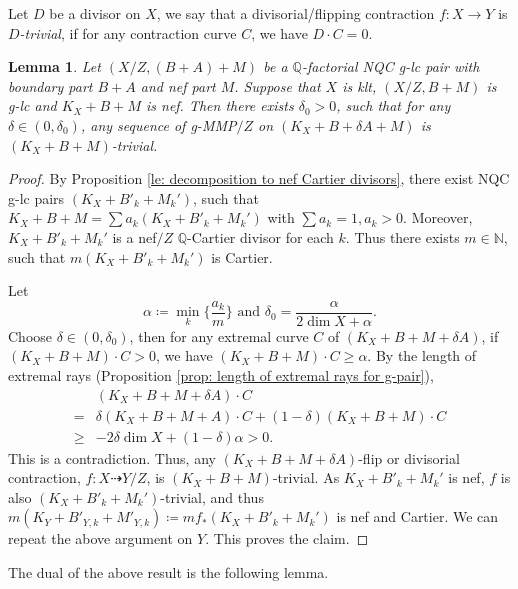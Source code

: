 \documentclass[11pt]{amsart}
\newcommand{\Qq}{\mathbb{Q}}
\newcommand{\Nn}{\mathbb{N}}
\newtheorem{lemma}[theorem]{Lemma}
\begin{document}
Let $D$ be a divisor on $X$, we say that a divisorial/flipping contraction $f: X \to Y$ is \emph{$D$-trivial}, if for any contraction curve $C$, we have $D \cdot C =0$.

\begin{lemma}\label{prop: K trivial}
	Let $(X/Z, (B+A)+M)$ be a $\Qq$-factorial NQC g-lc pair with boundary part $B+A$  and nef part $M$. Suppose that $X$ is klt, $(X/Z,B+M)$ is g-lc and $K_X+B+M$ is nef. Then there exists $\delta_0>0$, such that for any $\delta \in (0, \delta_0)$, any sequence of g-MMP$/Z$ on $(K_X+B+\delta A+M)$ is $(K_X+B+M)$-trivial.
\end{lemma}

\begin{proof}
	By Proposition \ref{le: decomposition to nef Cartier divisors}, there exist NQC g-lc pairs $(K_X+B'_k +M_k')$, such that 
	$K_X+B+M = \sum a_k (K_X+B'_k +M_k')$ with $\sum a_k =1, a_k >0$. Moreover, $K_X+B'_k +M_k'$ is a nef$/Z$ $\Qq$-Cartier divisor for each $k$. Thus there exists $m\in\Nn$, such that $m(K_X+B'_k +M_k')$ is Cartier. 
	
	Let 
	\[
	\alpha\coloneqq \min_k\{\frac{a_k}{m}\} \text{~and~} \delta_0=\frac{\alpha}{2\dim X+\alpha}.
	\] Choose $\delta \in (0,\delta_0)$, then for any extremal curve $C$ of $(K_X+B+M+\delta A)$, if $(K_X+B+M) \cdot C>0$, we have  $(K_X+B+M) \cdot C \geq \alpha$. By the length of extremal rays (Proposition \ref{prop: length of extremal rays for g-pair}),
	\begin{align*}
	&(K_X+B+M+\delta A)\cdot C\\
	=&\delta(K_X+B+M+A)\cdot C+(1-\delta)(K_X+B+M)\cdot C\\
	\ge& -2\delta\dim X+(1-\delta)\alpha>0.
	\end{align*} This is a contradiction. 
	Thus, any $(K_X+B+M+\delta A)$-flip or divisorial contraction, $f: X \dashrightarrow Y/Z$, is $(K_X+B+M)$-trivial. As $K_X+B'_k +M_k'$ is nef, $f$ is also $(K_X+B'_k +M_k')$-trivial, and thus $m(K_Y+B'_{Y,k}+M'_{Y,k})\coloneqq mf_{*}(K_X+B'_k +M_k')$ is nef and Cartier. We can repeat the above argument on $Y$. This proves the claim. 
\end{proof}

The dual of the above result is the following lemma. 
\end{document}
